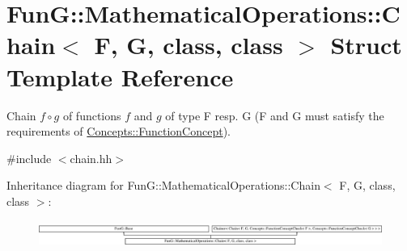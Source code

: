 \hypertarget{structFunG_1_1MathematicalOperations_1_1Chain}{}\section{Fun\+G\+:\+:Mathematical\+Operations\+:\+:Chain$<$ F, G, class, class $>$ Struct Template Reference}
\label{structFunG_1_1MathematicalOperations_1_1Chain}


Chain $ f\circ g $ of functions $f$ and $g$ of type F resp. G (F and G must satisfy the requirements of \hyperlink{structFunG_1_1Concepts_1_1FunctionConcept}{Concepts\+::\+Function\+Concept}).  




{\ttfamily \#include $<$chain.\+hh$>$}

Inheritance diagram for Fun\+G\+:\+:Mathematical\+Operations\+:\+:Chain$<$ F, G, class, class $>$\+:\begin{figure}[H]
\begin{center}
\leavevmode
\includegraphics[height=0.879121cm]{structFunG_1_1MathematicalOperations_1_1Chain}
\end{center}
\end{figure}
